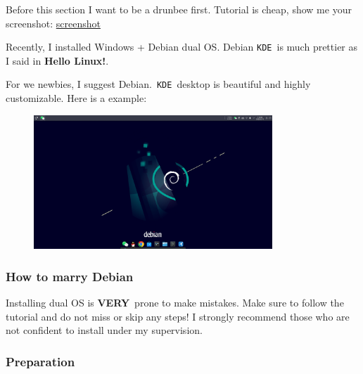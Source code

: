 \documentclass[12pt]{ctexart}
\newenvironment{mdquote}
{%
  \par\noindent
  \begin{list}{}{%
      \setlength{\leftmargin}{1em}%
      \setlength{\rightmargin}{0pt}%
      \setlength{\itemindent}{0pt}%
      \setlength{\listparindent}{\parindent}%
      \setlength{\topsep}{0.5\baselineskip}%
  }
  \item[\textbf{>}\ ]\itshape
}
{\end{list}\par}
\begin{document}
Before this section I want to be a drunbee first. Tutorial is cheap,
show me your screenshot: \href{https://raw.githubusercontent.com/Octopus058/Introduction-to-Linux/refs/heads/main/assets/Linux/3.1%20Seek%20common%20ground%20while%20reserving%20differences/example.gif}{screenshot}

Recently, I installed Windows + Debian dual OS. Debian \texttt{KDE}\ is
much prettier as I said in \textbf{Hello Linux!}.

\begin{mdquote}
For we newbies, I suggest Debian.\ \texttt{KDE}\ desktop is beautiful and
highly customizable. Here is a example:

\begin{figure}[H]
    \centering
    \includegraphics[width=0.8\textwidth,keepaspectratio]{assets/Linux/3.1 Seek common ground while reserving differences/1.png}
\end{figure}

\end{mdquote}

\subsubsection{\textbf{How to marry Debian}}

\begin{mdquote}
Installing dual OS is \textbf{VERY}\ prone to make mistakes. Make sure to
follow the tutorial and do not miss or skip any steps! I strongly
recommend those who are not confident to install under my supervision.
\end{mdquote}

\subsubsection*{\textbf{Preparation}}
\end{document}
